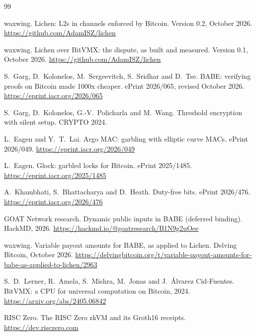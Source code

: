 \documentclass[11pt]{article}
\begin{document}
\begin{thebibliography}{99}

 waxwing. Lichen: L2s in channels enforced by Bitcoin. Version 0.2, October 2026. \url{https://github.com/AdamISZ/lichen}

 waxwing. Lichen over BitVMX: the dispute, as built and measured. Version 0.1, October 2026. \url{https://github.com/AdamISZ/lichen}

 S.~Garg, D.~Kolonelos, M.~Sergeevitch, S.~Sridhar and D.~Tse. BABE: verifying proofs on Bitcoin made 1000x cheaper. ePrint 2026/065, revised October 2026. \url{https://eprint.iacr.org/2026/065}

 S.~Garg, D.~Kolonelos, G.-V.~Policharla and M.~Wang. Threshold encryption with silent setup. CRYPTO 2024.

 L.~Eagen and Y.~T.~Lai. Argo MAC: garbling with elliptic curve MACs. ePrint 2026/049. \url{https://eprint.iacr.org/2026/049}

 L.~Eagen. Glock: garbled locks for Bitcoin. ePrint 2025/1485. \url{https://eprint.iacr.org/2025/1485}

 A.~Khambhati, S.~Bhattacharya and D.~Heath. Duty-free bits. ePrint 2026/476. \url{https://eprint.iacr.org/2026/476}

 GOAT Network research. Dynamic public inputs in BABE (deferred binding). HackMD, 2026. \url{https://hackmd.io/@goatresearch/B1N9g2uOee}

 waxwing. Variable payout amounts for BABE, as applied to Lichen. Delving Bitcoin, October 2026. \url{https://delvingbitcoin.org/t/variable-payout-amounts-for-babe-as-applied-to-lichen/2963}

 S.~D.~Lerner, R.~Amela, S.~Mishra, M.~Jonas and J.~\'Alvarez Cid-Fuentes. BitVMX: a CPU for universal computation on Bitcoin, 2024. \url{https://arxiv.org/abs/2405.06842}

 RISC Zero. The RISC Zero zkVM and its Groth16 receipts. \url{https://dev.risczero.com}

\end{thebibliography}
\end{document}
